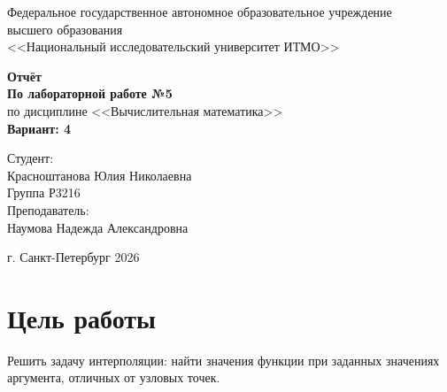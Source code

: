 \documentclass[12pt,a4paper]{article}
\begin{document}
\begin{titlepage}
    \begin{center}
        Федеральное государственное автономное образовательное учреждение\\
        высшего образования\\
        <<Национальный исследовательский университет ИТМО>>

        \vspace*{0.28\textheight}

        {\Large \textbf{Отчёт}}\\
        {\large \textbf{По лабораторной работе №5}}\\
        {\large по дисциплине <<Вычислительная математика>>}\\
        {\large \textbf{Вариант: 4}}
    \end{center}

    \vfill

    \begin{flushright}
        Студент:\\
        Красноштанова Юлия Николаевна\\
        Группа Р3216\\
        Преподаватель:\\
        Наумова Надежда Александровна
    \end{flushright}

    \vfill

    \begin{center}
        г. Санкт-Петербург 2026
    \end{center}
\end{titlepage}

\section*{Цель работы}
Решить задачу интерполяции: найти значения функции при заданных значениях аргумента, отличных от узловых точек.
\end{document}
